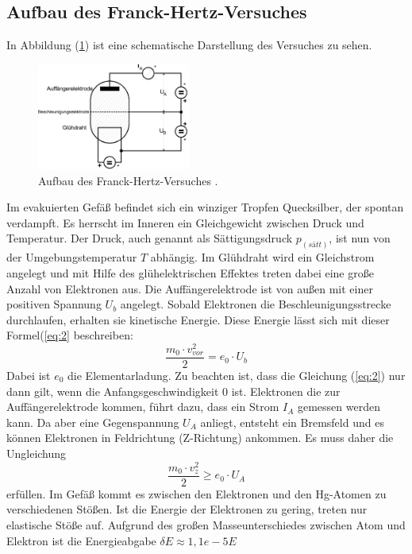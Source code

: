 \subsection{Aufbau des Franck-Hertz-Versuches}
In Abbildung (\ref{abb:1}) ist eine schematische Darstellung des Versuches zu sehen.
\begin{figure}[H]
\centering
\includegraphics[width =5 cm, height = 3.5cm]{content/Aufbau.jpg}
\caption{Aufbau des Franck-Hertz-Versuches \cite{1}.}
\label{abb:1}
\end{figure}
Im evakuierten Gefäß befindet sich ein winziger Tropfen Quecksilber, der spontan verdampft. Es herrscht im Inneren ein
Gleichgewicht zwischen Druck und Temperatur. Der Druck, auch genannt als Sättigungsdruck $p_(sätt)$, ist nun
von der Umgebungstemperatur $T$ abhängig.
Im Glühdraht wird ein Gleichstrom angelegt und mit Hilfe des glühelektrischen Effektes treten dabei eine große Anzahl von
Elektronen aus. Die Auffängerelektrode ist von außen mit einer positiven Spannung $U_b$ angelegt.
Sobald Elektronen die Beschleunigungsstrecke durchlaufen, erhalten sie kinetische Energie.
Diese Energie lässt sich mit dieser Formel(\ref{eq:2} beschreiben:
\begin{equation}
  \frac{m_0 \cdot v_{vor}^2} {2} = e_0 \cdot U_b
  \label{eq:2}
\end{equation}
Dabei ist $e_0$ die Elementarladung. Zu beachten ist, dass die Gleichung (\ref{eq:2}) nur dann gilt, wenn
die Anfangsgeschwindigkeit $0$ ist.
Elektronen die zur Auffängerelektrode kommen, führt dazu, dass ein Strom $I_A$ gemessen werden kann.
Da aber eine Gegenspannung $U_A$ anliegt, entsteht ein Bremsfeld und es können Elektronen in Feldrichtung (Z-Richtung) ankommen.
Es muss daher die Ungleichung
\begin{equation*}
  \frac{m_0 \cdot v_{z}^2} {2} \geq e_0 \cdot U_A
\end{equation*}
erfüllen.
Im Gefäß kommt es zwischen den Elektronen und den Hg-Atomen zu verschiedenen Stößen.
Ist die Energie der Elektronen zu gering, treten nur elastische Stöße auf. Aufgrund des großen
Masseunterschiedes zwischen Atom und Elektron ist die Energieabgabe $\delta E \approx  1,1e-5 E$
